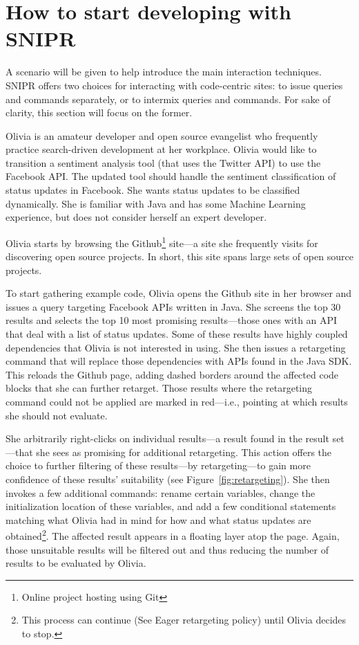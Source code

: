 \section{How to start developing with \uppercase{SnipR}}
\label{sec:sniprscenario}

A scenario will be given to help introduce the main interaction techniques. \uppercase{SnipR} offers two choices for interacting with code-centric sites: to issue queries and commands separately, or to intermix queries and commands. For sake of clarity, this section will focus on the former.

Olivia is an amateur developer and open source evangelist who frequently practice search-driven development at her workplace. Olivia would like to transition a sentiment analysis tool (that uses the Twitter API) to use the Facebook API. The updated tool should handle the sentiment classification of status updates in Facebook. She wants status updates to be classified dynamically. She is familiar with Java and has some Machine Learning experience, but does not consider herself an expert developer.

Olivia starts by browsing the Github\footnote{Online project hosting using Git} site---a site she frequently visits for discovering open source projects. In short, this site spans large sets of open source projects.

To start gathering example code, Olivia opens the Github site in her browser and issues a query targeting Facebook APIs written in Java. She screens the top 30 results and selects the top 10 most promising results---those ones with an API that deal with a list of status updates. Some of these results have highly coupled dependencies that Olivia is not interested in using. She then issues a retargeting command that will replace those dependencies with APIs found in the Java SDK. This reloads the Github page, adding dashed borders around the affected code blocks that she can further retarget. Those results where the retargeting command could not be applied are marked in red---i.e., pointing at which results she should not evaluate.

She arbitrarily right-clicks on individual results---a result found in the result set---that she sees as promising for additional retargeting. This action offers the choice to further filtering of these results---by retargeting---to gain more confidence of these results' suitability (see Figure~\ref{fig:retargeting}). She then invokes a few additional commands: rename certain variables, change the initialization location of these variables, and add a few conditional statements matching what Olivia had in mind for how and what status updates are obtained\footnote{This process can continue (See Eager retargeting policy) until Olivia decides to stop.}. The affected result appears in a floating layer atop the page. Again, those unsuitable results will be filtered out and thus reducing the number of results to be evaluated by Olivia.

